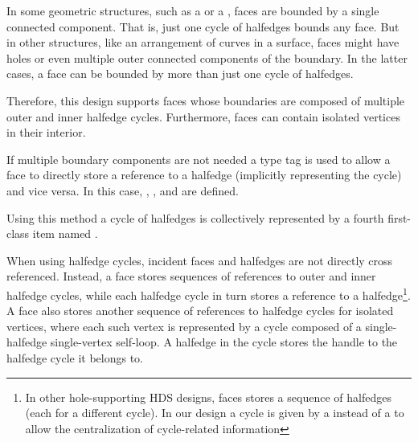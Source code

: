 
{
In some geometric structures, such as a  or a ,
faces are bounded by a single connected component. That is, just one cycle of halfedges bounds
any face. But in other structures, like an arrangement of curves in a surface, faces
might have holes or even multiple outer connected components of the boundary. 
In the latter cases, a face can be bounded by more than just one cycle of halfedges. 

Therefore, this design supports faces
whose boundaries are composed of multiple outer and inner halfedge cycles. Furthermore, faces can contain isolated vertices in their interior.




If multiple boundary components are not needed a type tag is used to allow a face to directly store 
a reference to a halfedge (implicitly representing the cycle) and vice versa. In this case, , ,  
and  are defined.


Using this method a cycle of halfedges is collectively represented 
by a fourth first-class  item named .

When using halfedge cycles, incident faces and halfedges are not directly cross referenced.
Instead, a face stores sequences of references to outer and inner halfedge cycles, while each 
halfedge cycle in turn stores a reference to a halfedge\footnote{In other
hole-supporting HDS designs, faces stores a sequence of halfedges (each for a different cycle).
In our design a cycle is given by a  instead of a  to allow 
the centralization of cycle-related information}. 
A face also stores another sequence of references to halfedge cycles for isolated vertices, where
each such vertex is represented by a cycle composed of a single-halfedge single-vertex self-loop.
A halfedge in the cycle stores the handle to the halfedge cycle it belongs to.

}
